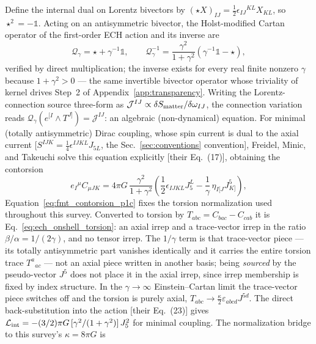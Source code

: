 \documentclass[aps,prd,twocolumn,superscriptaddress,showpacs,preprintnumbers,nofootinbib,longbibliography,floatfix]{revtex4-2}
\begin{document}
Define the internal dual on Lorentz bivectors by
$(\star X)_{IJ}=\tfrac12\epsilon_{IJ}{}^{KL}X_{KL}$, so
$\star^2=-\mathbb 1$. Acting on an antisymmetric bivector, the
Holst-modified Cartan operator of the first-order ECH action and its
inverse are
\begin{equation}\label{eq:holst_cartan_inverse_p1c}
\mathcal Q_\gamma=\star+\gamma^{-1}\mathbb 1,\qquad
\mathcal Q_\gamma^{-1}
=\frac{\gamma^2}{1+\gamma^2}\left(\gamma^{-1}\mathbb 1-\star\right),
\end{equation}
verified by direct multiplication; the inverse exists for every real
finite nonzero $\gamma$ because $1+\gamma^2>0$ --- the same invertible
bivector operator whose triviality of kernel drives Step~2 of
Appendix~\ref{app:transparency}. Writing the Lorentz-connection source
three-form as $\mathcal J^{IJ}\propto\delta S_{\rm
matter}/\delta\omega_{IJ}$, the connection variation reads
$\mathcal Q_\gamma(e^{[I}\wedge T^{J]})=\mathcal J^{IJ}$: an algebraic
(non-dynamical) equation. For minimal (totally antisymmetric) Dirac
coupling, whose spin current is dual to the axial current
[$S^{IJK}=\tfrac14\epsilon^{IJKL}J_{5L}$, the Sec.~\ref{sec:conventions}
convention], Freidel,
Minic, and Takeuchi solve this equation explicitly [their Eq.~(17)],
obtaining the contorsion
\begin{equation}\label{eq:fmt_contorsion_p1c}
e_I{}^\mu C_{\mu JK}=4\pi G\,\frac{\gamma^2}{1+\gamma^2}
\left(\frac12\epsilon_{IJKL}J_5^L
-\frac1\gamma\,\eta_{I[J}J^5_{K]}\right),
\end{equation}
Equation~\eqref{eq:fmt_contorsion_p1c} fixes the torsion normalization
used throughout this survey. Converted to torsion by
$T_{abc}=C_{bac}-C_{cab}$ it is Eq.~\eqref{eq:ech_onshell_torsion}: an
axial irrep and a trace-vector irrep in the ratio
$\beta/\alpha=1/(2\gamma)$, and no tensor irrep. The $1/\gamma$ term is
that trace-vector piece --- its totally antisymmetric part vanishes
identically and it carries the entire torsion trace $T^a{}_{ac}$ --- not
an axial piece written in another basis; being \emph{sourced} by the
pseudo-vector $J^5$ does not place it in the axial irrep, since irrep
membership is fixed by index structure. In the $\gamma\to\infty$
Einstein--Cartan limit the trace-vector piece switches off and the
torsion is purely axial,
$T_{abc}\to\tfrac{\kappa}{2}\varepsilon_{abcd}J^{5d}$.
The direct back-substitution into the action [their Eq.~(23)]
gives $\mathcal L_{\rm int}=-(3/2)\pi
G\,[\gamma^2/(1+\gamma^2)]\,J_5^2$ for minimal coupling. The
normalization bridge to this survey's $\kappa=8\pi G$ is
\end{document}
